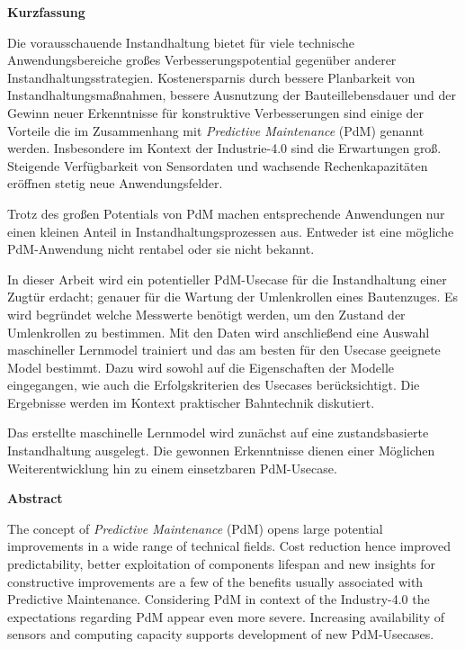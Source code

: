 \begin{center}
	\textbf{Kurzfassung}
\end{center}
Die vorausschauende Instandhaltung bietet für viele technische Anwendungsbereiche großes Verbesserungspotential gegenüber anderer Instandhaltungsstrategien. Kostenersparnis durch bessere Planbarkeit von Instandhaltungsmaßnahmen, bessere Ausnutzung der Bauteillebensdauer und der Gewinn neuer Erkenntnisse für konstruktive Verbesserungen sind einige der Vorteile die im Zusammenhang mit \textit{Predictive Maintenance} (PdM) genannt werden. Insbesondere im Kontext der Industrie-{4.0} sind die Erwartungen groß. Steigende Verfügbarkeit von Sensordaten und wachsende Rechenkapazitäten eröffnen stetig neue Anwendungsfelder.

Trotz des großen Potentials von PdM machen entsprechende Anwendungen nur einen kleinen Anteil in Instandhaltungsprozessen aus. Entweder ist eine mögliche PdM-Anwendung nicht rentabel oder sie nicht bekannt.

In dieser Arbeit wird ein potentieller PdM-Usecase für die Instandhaltung einer Zugtür erdacht; genauer für die Wartung der Umlenkrollen eines Bautenzuges. Es wird begründet welche Messwerte benötigt werden, um den Zustand der Umlenkrollen zu bestimmen. Mit den Daten wird anschließend eine Auswahl maschineller Lernmodel trainiert und das am besten für den Usecase geeignete Model bestimmt. Dazu wird sowohl auf die Eigenschaften der Modelle eingegangen, wie auch die Erfolgskriterien des Usecases berücksichtigt. Die Ergebnisse werden im Kontext praktischer Bahntechnik diskutiert.

Das erstellte maschinelle Lernmodel wird zunächst auf eine zustandsbasierte Instandhaltung ausgelegt. Die gewonnen Erkenntnisse dienen einer Möglichen Weiterentwicklung hin zu einem einsetzbaren PdM-Usecase.
\clearpage
\begin{center}
	\textbf{Abstract}
\end{center}
The concept of \textit{Predictive Maintenance} (PdM) opens large potential improvements in a wide range of technical fields. Cost reduction hence improved predictability, better exploitation of components lifespan and new insights for constructive improvements are a few of the benefits usually associated with Predictive Maintenance. Considering PdM in context of the Industry-{4.0} the expectations regarding PdM appear even more severe. Increasing availability of sensors and computing capacity supports development of new PdM-Usecases.

